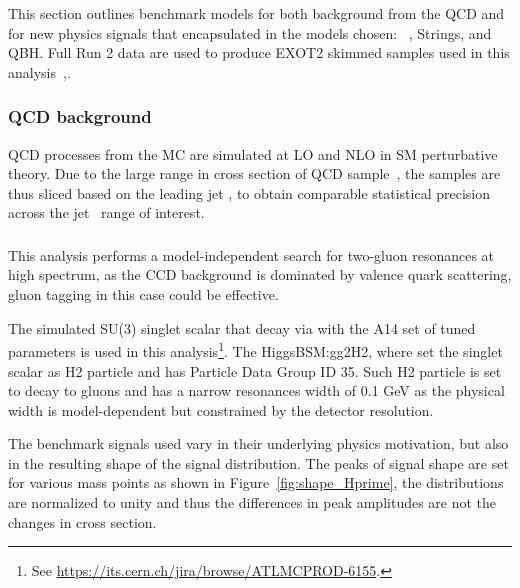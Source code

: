 This section outlines benchmark models for both background from the QCD and for new
physics signals that encapsulated in the models chosen:
\Hprime\ , Strings, and QBH.
Full Run 2 data are used to produce EXOT2 skimmed samples used in this analysis~\cite{ATLAS:Exot2Derivation},.

\subsubsection{QCD background}
\label{qcdsamps}

QCD processes from the MC are simulated at LO and NLO in SM perturbative theory. Due to the large range in cross section of QCD sample~\cite{Marshall:2016630}, the samples are thus sliced based on the leading jet \pt,  to obtain comparable statistical precision across the jet \pt~range of interest.



\subsubsection{\Hprime}
\label{sec:hprime}

This analysis performs a model-independent search for two-gluon resonances at high \mjj spectrum, as the CCD background is dominated by valence quark scattering, gluon tagging in this case could be effective. 

The simulated SU(3) singlet scalar that decay via  with the A14 set of tuned 
parameters is used in this analysis\footnote{See \url{https://its.cern.ch/jira/browse/ATLMCPROD-6155}.}. The HiggsBSM:gg2H2, where set the singlet scalar as H2 particle and has Particle Data Group ID 35. Such H2 particle is set to decay to gluons and has a narrow resonances width of 0.1 GeV as the physical width is 
model-dependent but constrained by the detector resolution.

The benchmark signals used vary in their underlying physics motivation, but also in the resulting shape of the signal \mjj distribution. The peaks of signal shape are set for various mass points as shown in Figure~\ref{fig:shape_Hprime}, the distributions are normalized to unity and thus the differences in peak amplitudes are not the changes in cross section.

